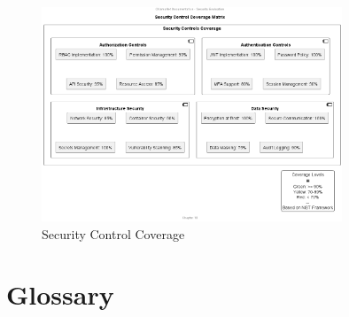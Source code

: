\begin{figure}[h]
\centering
\includegraphics[width=0.8\textwidth]{Chapter09/figures/security_control_coverage.png}
\caption{Security Control Coverage}
\label{fig:security_control}
\end{figure}


\section{Glossary}

